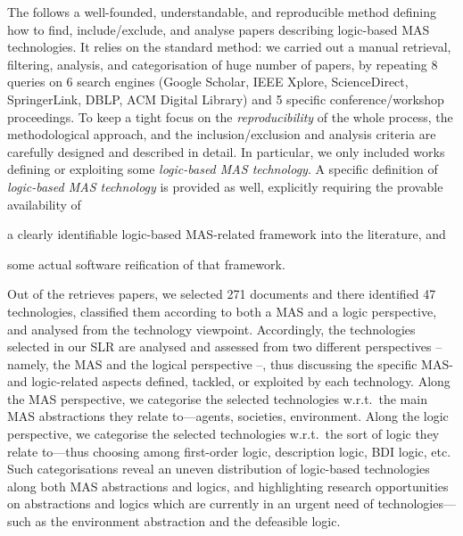 \documentclass[12pt,a4paper,openright,twoside]{book}
\begin{document}
The \slr{} follows a well-founded, understandable, and reproducible method defining how to find, include/exclude, and analyse papers describing logic-based MAS technologies.
%
It relies on the standard \slr{} method: we carried out a manual retrieval, filtering, analysis, and categorisation of huge number of papers, by repeating 8 queries on 6 search engines (Google Scholar, IEEE Xplore, ScienceDirect, SpringerLink, DBLP, ACM Digital Library) and 5 specific conference/workshop proceedings.
%
To keep a tight focus on the \emph{reproducibility} of the whole process, the methodological approach, and the inclusion/exclusion and analysis criteria are carefully designed and described in detail.
%
In particular, we only included works defining or exploiting some \emph{logic-based MAS technology}.
%
A specific definition of \emph{logic-based MAS technology} is provided as well, explicitly requiring the provable availability of
%
\begin{inlinelist}
    \item a clearly identifiable logic-based MAS-related framework into the literature, and
    \item some actual software reification of that framework.
\end{inlinelist}

%
Out of the retrieves papers, we selected 271 documents and there identified 47 technologies, classified them according to both a MAS and a logic perspective, and analysed from the technology viewpoint.
%
Accordingly, the technologies selected in our SLR are analysed and assessed from two different perspectives -- namely, the MAS and the logical perspective --, thus discussing the specific MAS- and logic-related aspects defined, tackled, or exploited by each technology.
%
Along the MAS perspective, we categorise the selected technologies w.r.t.\ the main MAS abstractions they relate to---agents, societies, environment.
%
Along the logic perspective, we categorise the selected technologies w.r.t.\ the sort of logic they relate to---thus choosing among first-order logic, description logic, BDI logic, etc.
%
Such categorisations reveal an uneven distribution of logic-based technologies along both MAS abstractions and logics, and highlighting research opportunities on abstractions and logics which are currently in an urgent need of technologies---such as the environment abstraction and the defeasible logic.
\end{document}

